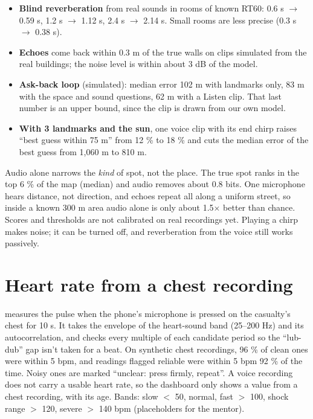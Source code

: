 \begin{itemize}
  \item \textbf{Blind reverberation} from real sounds in rooms of known RT60: 0.6 s $\rightarrow$ 0.59 s,
        1.2 s $\rightarrow$ 1.12 s, 2.4 s $\rightarrow$ 2.14 s. Small rooms are less precise (0.3 s $\rightarrow$ 0.38 s).
  \item \textbf{Echoes} come back within 0.3 m of the true walls on clips simulated from the real buildings; the noise level
        is within about 3 dB of the model.
  \item \textbf{Ask-back loop} (simulated): median error 102 m with landmarks only, 83 m with the space and sound questions,
        62 m with a Listen clip. That last number is an upper bound, since the clip is drawn from our own model.
  \item \textbf{With 3 landmarks and the sun}, one voice clip with its end chirp raises ``best guess within 75 m'' from 12 \%
        to 18 \% and cuts the median error of the best guess from 1,060 m to 810 m.
\end{itemize}

\begin{caveat}
Audio alone narrows the \emph{kind} of spot, not the place. The true spot ranks in the top 6 \% of the map (median) and
audio removes about 0.8 bits. One microphone hears distance, not direction, and echoes repeat all along a uniform
street, so inside a known 300 m area audio alone is only about 1.5$\times$ better than chance. Scores and thresholds
are not calibrated on real recordings yet. Playing a chirp makes noise; it can be turned off, and reverberation from
the voice still works passively.
\end{caveat}

\section{Heart rate from a chest recording}

 measures the pulse when the phone's microphone is pressed on the casualty's chest for 10 s. It takes the
envelope of the heart-sound band (25--200 Hz) and its autocorrelation, and checks every multiple of each candidate period
so the ``lub-dub'' gap isn't taken for a beat. On synthetic chest recordings, 96 \% of clean ones were within 5 bpm, and
readings flagged reliable were within 5 bpm 92 \% of the time. Noisy ones are marked ``unclear: press firmly, repeat''.
A voice recording does not carry a usable heart rate, so the dashboard only shows a value from a chest recording, with its
age. Bands: slow $<$ 50, normal, fast $>$ 100, shock range $>$ 120, severe $>$ 140 bpm (placeholders for the mentor).
